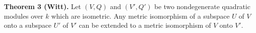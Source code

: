 \textbf{Theorem 3 (Witt).} Let $(V,Q)$ and $(V',Q')$ be two nondegenerate quadratic modules over $k$ which are isometric. Any metric isomorphism of a subspace $U$ of $V$ onto a subspace $U'$ of $V'$ can be extended to a metric isomorphism of $V$ onto $V'$.
